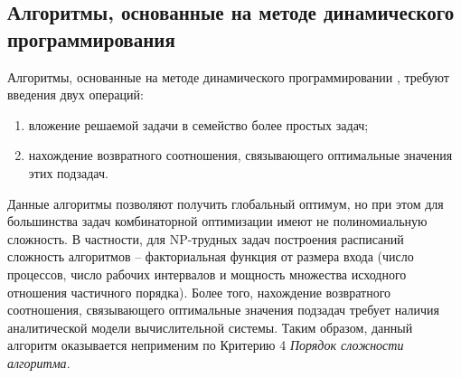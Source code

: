 \documentclass{article}
\begin{document}
  \subsection{Алгоритмы, основанные на методе динамического программирования}
  Алгоритмы, основанные на методе динамического программировании \cite{Bellman_1966}, требуют введения двух операций:
  \begin{enumerate}
    \item вложение решаемой задачи в семейство более простых задач;
    \item нахождение возвратного соотношения, связывающего оптимальные значения этих подзадач.
  \end{enumerate}
  Данные алгоритмы позволяют получить глобальный оптимум, но при этом для большинства задач комбинаторной оптимизации имеют не полиномиальную сложность. В частности, для NP-трудных задач построения расписаний \cite{Held_Karp_1962} сложность алгоритмов – факториальная функция от размера входа (число процессов, число рабочих интервалов и мощность множества исходного отношения частичного порядка). Более того, нахождение возвратного соотношения, связывающего оптимальные значения подзадач требует наличия аналитической модели вычислительной системы. Таким образом, данный алгоритм оказывается неприменим по Критерию 4 \textit{Порядок сложности алгоритма}.
  
  \printbibliography
\end{document}
